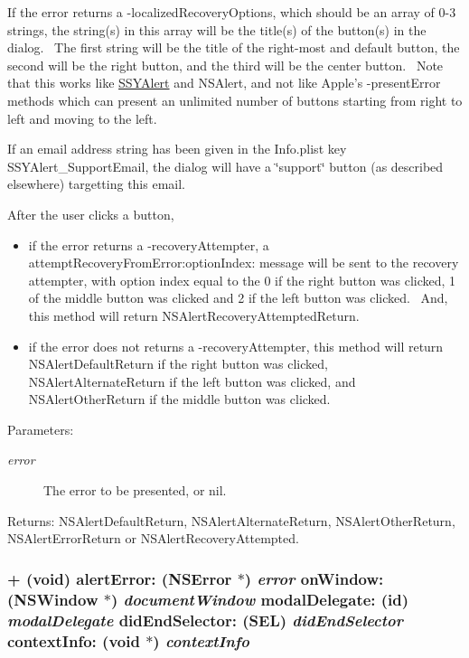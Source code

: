 If the error returns a -localizedRecoveryOptions, which should be an array of 0-3 strings, the string(s) in this array will be the title(s) of the button(s) in the dialog.~ The first string will be the title of the right-most and default button, the second will be the right button, and the third will be the center button.~ Note that this works like \hyperlink{interface_s_s_y_alert}{SSYAlert} and NSAlert, and not like Apple's -presentError methods which can present an unlimited number of buttons starting from right to left and moving to the left.

If an email address string has been given in the Info.plist key SSYAlert\_\-SupportEmail, the dialog will have a \char`\"{}support\char`\"{} button (as described elsewhere) targetting this email.

After the user clicks a button, \begin{itemize}
\item if the error returns a -recoveryAttempter, a attemptRecoveryFromError:optionIndex: message will be sent to the recovery attempter, with option index equal to the 0 if the right button was clicked, 1 of the middle button was clicked and 2 if the left button was clicked.~ And, this method will return NSAlertRecoveryAttemptedReturn. \item if the error does not returns a -recoveryAttempter, this method will return NSAlertDefaultReturn if the right button was clicked, NSAlertAlternateReturn if the left button was clicked, and NSAlertOtherReturn if the middle button was clicked. \end{itemize}


\begin{Desc}
\item[Parameters:]
\begin{description}
\item[{\em error}]The error to be presented, or nil. \end{description}
\end{Desc}
\begin{Desc}
\item[Returns:]NSAlertDefaultReturn, NSAlertAlternateReturn, NSAlertOtherReturn, NSAlertErrorReturn or NSAlertRecoveryAttempted. \end{Desc}
\hypertarget{interface_s_s_y_alert_f30ca2fe3aef894f71d33c031b57cae5}{
\subsubsection[{alertError:onWindow:modalDelegate:didEndSelector:contextInfo:}]{\setlength{\rightskip}{0pt plus 5cm}+ (void) alertError: (NSError $\ast$) {\em error}\/ onWindow: (NSWindow $\ast$) {\em documentWindow}\/ modalDelegate: (id) {\em modalDelegate}\/ didEndSelector: (SEL) {\em didEndSelector}\/ contextInfo: (void $\ast$) {\em contextInfo}}}
\label{interface_s_s_y_alert_f30ca2fe3aef894f71d33c031b57cae5}


